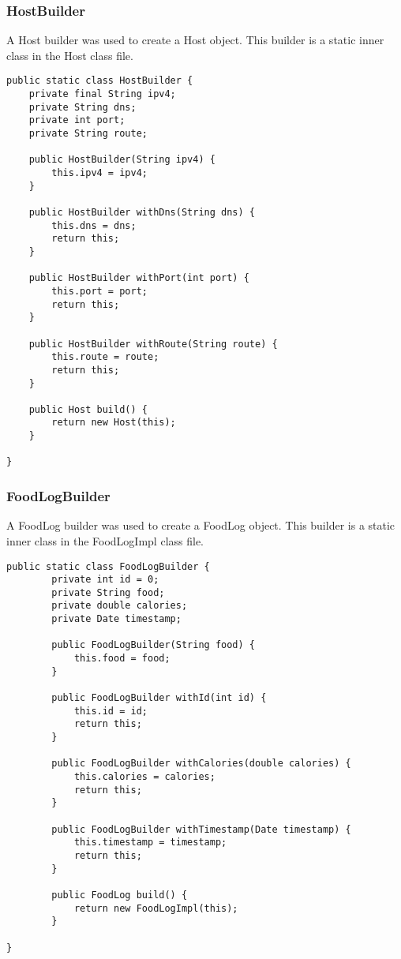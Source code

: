 \subsubsection*{HostBuilder}
A Host builder was used to create a Host object.
This builder is a static inner class in the Host class file.
\begin{lstlisting}[style=Java]
public static class HostBuilder {
    private final String ipv4;
    private String dns;
    private int port;
    private String route;

    public HostBuilder(String ipv4) {
        this.ipv4 = ipv4;
    }

    public HostBuilder withDns(String dns) {
        this.dns = dns;
        return this;
    }

    public HostBuilder withPort(int port) {
        this.port = port;
        return this;
    }

    public HostBuilder withRoute(String route) {
        this.route = route;
        return this;
    }

    public Host build() {
        return new Host(this);
    }

}
\end{lstlisting}

\subsubsection*{FoodLogBuilder}
A FoodLog builder was used to create a FoodLog object.
This builder is a static inner class in the FoodLogImpl class file.
\begin{lstlisting}[style=Java]
public static class FoodLogBuilder {
        private int id = 0;
        private String food;
        private double calories;
        private Date timestamp;

        public FoodLogBuilder(String food) {
            this.food = food;
        }

        public FoodLogBuilder withId(int id) {
            this.id = id;
            return this;
        }

        public FoodLogBuilder withCalories(double calories) {
            this.calories = calories;
            return this;
        }

        public FoodLogBuilder withTimestamp(Date timestamp) {
            this.timestamp = timestamp;
            return this;
        }

        public FoodLog build() {
            return new FoodLogImpl(this);
        }

}
\end{lstlisting}

